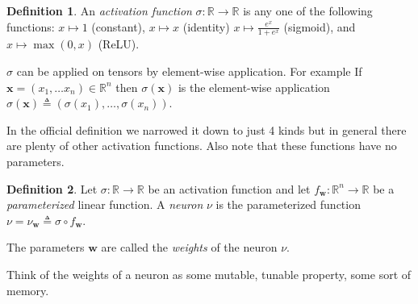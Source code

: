 \documentclass[11pt, a4paper]{report}
\theoremstyle{plain}
\theoremstyle{definition}
\newtheorem{mydef}{Definition}[chapter]
\theoremstyle{remark}
\newcommand{\R}{\mathbb{R}}
\newcommand{\x}{\mathbf{x}}
\newcommand{\w}{\mathbf{w}}
\begin{document}
\begin{mydef}
\label{def:activationfunction}
An \emph{activation function} $\sigma : \R \to \R$ is any one of the following functions:
$x \mapsto 1$ (constant), $x \mapsto x$ (identity)
$ x \mapsto \frac{e^x}{1 + e^x}$ (sigmoid), and $x \mapsto \max(0,x)$ (ReLU).

$\sigma$ can be applied on tensors by element-wise application.
For example
If $\x = (x_1, \dots x_n) \in \R^n$ then $\sigma(\x)$ is the element-wise application
$\sigma(\x) \triangleq (\sigma(x_1), \dots , \sigma(x_n))$.
\end{mydef}

In the official definition we narrowed it down to just 4 kinds but in general
there are plenty of other activation functions. Also note that these functions
have no parameters.

\begin{mydef}
\label{def:neuron}
Let $\sigma : \R \to \R$ be an activation function and let $f_{\w} : \R^n \to \R$
be a \emph{parameterized} linear function. A \emph{neuron} $\nu$ is the
parameterized function 
$\nu =  \nu_{\w} \triangleq \sigma \circ
f_{\w}$.

The parameters $\w$ are called the \emph{weights} of the neuron $\nu$.
\end{mydef}

Think of the weights of a neuron as some mutable, tunable property, some sort of memory.
\end{document}
